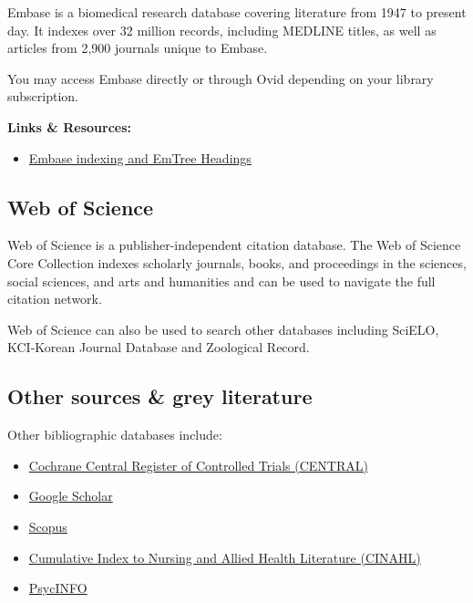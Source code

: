 \documentclass[
]{book}
\providecommand{\tightlist}{%
  \setlength{\itemsep}{0pt}\setlength{\parskip}{0pt}}
\begin{document}
Embase is a biomedical research database covering literature from 1947 to present day. It indexes over 32 million records, including MEDLINE titles, as well as articles from 2,900 journals unique to Embase.

You may access Embase directly or through Ovid depending on your library subscription.

\textbf{Links \& Resources:}

\begin{itemize}
\tightlist
\item
  \href{https://www.elsevier.com/solutions/embase-biomedical-research/embase-coverage-and-content}{Embase indexing and EmTree Headings}
\end{itemize}

\hypertarget{web-of-science}{%
\subsection{Web of Science}\label{web-of-science}}

Web of Science is a publisher-independent citation database. The Web of Science Core Collection indexes scholarly journals, books, and proceedings in the sciences, social sciences, and arts and humanities and can be used to navigate the full citation network.

Web of Science can also be used to search other databases including SciELO, KCI-Korean Journal Database and Zoological Record.

\hypertarget{other-sources-grey-literature}{%
\subsection{Other sources \& grey literature}\label{other-sources-grey-literature}}

Other bibliographic databases include:

\begin{itemize}
\tightlist
\item
  \href{https://www.cochranelibrary.com/central/about-central}{Cochrane Central Register of Controlled Trials (CENTRAL)}
\item
  \href{https://scholar.google.com/}{Google Scholar}
\item
  \href{https://www.scopus.com/home.uri}{Scopus}
\item
  \href{https://www.ebscohost.com/nursing/products/cinahl-databases/cinahl-complete}{Cumulative Index to Nursing and Allied Health Literature (CINAHL)}
\item
  \href{https://www.apa.org/pubs/databases/psycinfo}{PsycINFO}
\end{itemize}
\end{document}
